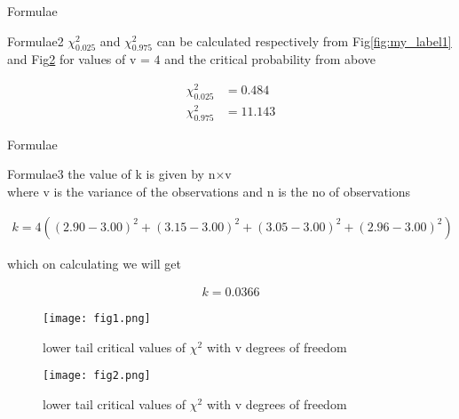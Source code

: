 \documentclass{beamer}
\providecommand{\brak}[1]{\ensuremath{\left(#1\right)}}
\begin{document}
\begin{frame}{Formulae}
    \begin{block}{Formulae2}
         $\chi^{2}_{0.025}$ and $\chi^{2}_{0.975}$ can be calculated respectively from Fig\ref{fig:my_label1} and Fig\ref{fig:my_label2} for values of v = $4$ and the critical probability from above 
         
         \begin{align}
             \chi^{2}_{0.025} &= 0.484  \\
             \chi^{2}_{0.975} &= 11.143
         \end{align}
         
    \end{block}
\end{frame}



\begin{frame}{Formulae}
    \begin{block}{Formulae3}
       the value of k is given by n$\times$v \\
       where v is the variance of the observations and n is the no of observations
       
       \begin{align*}
           k= 4\brak{ (2.90 - 3.00)^{2} + (3.15 - 3.00)^{2} + (3.05 - 3.00)^{2} + (2.96 - 3.00)^{2} }
       \end{align*}
       
       which on calculating we will get 
       
       \begin{align}
           k = 0.0366
       \end{align}
       
    \end{block}
\end{frame}



\begin{frame}

     \begin{figure}
           \centering
           \texttt{[image: fig1.png]}
           \caption{ lower tail critical values of ${\chi}^{2}$ with v degrees of freedom }
          \label{fig:my_ label1}
      \end{figure}
      
\end{frame}



\begin{frame}

     \begin{figure}
           \centering
           \texttt{[image: fig2.png]}
           \caption{{ lower tail critical values of ${\chi}^{2}$ with v degrees of freedom }}
           \label{fig:my_label2}
      \end{figure}
      
\end{frame}
\end{document}
